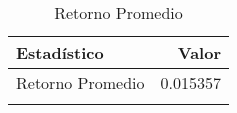 \begin{table}[H]
\label{tab:retorno_promedio}
\centering
\begin{tabular}{lr}
Estad\'istico & Valor \\
\midrule
Retorno Promedio & 0.015357 \\
\bottomrule
\caption{Retorno Promedio}
\end{tabular}
\end{table}

